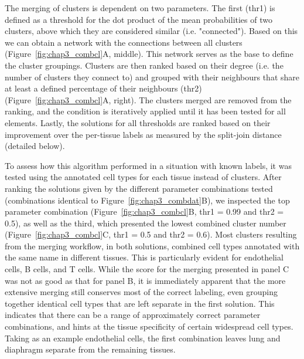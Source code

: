 The merging of clusters is dependent on two parameters. The first (thr1) is defined as a threshold for the dot product of the mean probabilities of two clusters, above which they are considered similar (i.e. "connected"). Based on this we can obtain a network with the connections between all clusters (Figure~\ref{fig:chap3_combcl}A, middle). This network serves as the base to define the cluster groupings. Clusters are then ranked based on their degree (i.e. the number of clusters they connect to) and grouped with their neighbours that share at least a defined percentage of their neighbours (thr2) (Figure~\ref{fig:chap3_combcl}A, right). The clusters merged are removed from the ranking, and the condition is iteratively applied until it has been tested for all elements. Lastly, the solutions for all thresholds are ranked based on their improvement over the per-tissue labels as measured by the split-join distance (detailed below).

To assess how this algorithm performed in a situation with known labels, it was tested using the annotated cell types for each tissue instead of clusters. After ranking the solutions given by the different parameter combinations tested (combinations identical to Figure~\ref{fig:chap3_combdat}B), we inspected the top parameter combination (Figure~\ref{fig:chap3_combcl}B, thr1 = 0.99 and thr2 = 0.5), as well as the third, which presented the lowest combined cluster number (Figure~\ref{fig:chap3_combcl}C, thr1 = 0.5 and thr2 = 0.6). Most clusters resulting from the merging workflow, in both solutions, combined cell types annotated with the same name in different tissues. This is particularly evident for endothelial cells, B cells, and T cells. While the score for the merging presented in panel C was not as good as that for panel B, it is immediately apparent that the more extensive merging still conserves most of the correct labeling, even grouping together identical cell types that are left separate in the first solution. This indicates that there can be a range of approximately correct parameter combinations, and hints at the tissue specificity of certain widespread cell types. Taking as an example endothelial cells, the first combination leaves lung and diaphragm separate from the remaining tissues.

